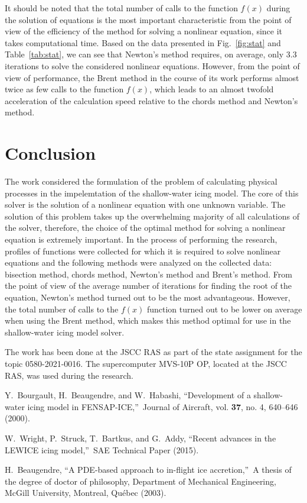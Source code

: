 \documentclass[
11pt,%
tightenlines,%
twoside,%
onecolumn,%
nofloats,%
nobibnotes,%
nofootinbib,%
superscriptaddress,%
noshowpacs,%
centertags]%
{revtex4}
\begin{document}
It should be noted that the total number of calls to the function $f(x)$ during the solution of equations is the most important characteristic from the point of view of the efficiency of the method for solving a nonlinear equation, since it takes computational time.
Based on the data presented in Fig.~\ref{fig:stat} and Table~\ref{tab:stat}, we can see that Newton's method requires, on average, only 3.3 iterations to solve the considered nonlinear equations.
However, from the point of view of performance, the Brent method in the course of its work performs almost twice as few calls to the function $f(x)$, which leads to an almost twofold acceleration of the calculation speed relative to the chords method and Newton's method.

\section{Conclusion}

The work considered the formulation of the problem of calculating physical processes in the impelemtation of the shallow-water icing model.
The core of this solver is the solution of a nonlinear equation with one unknown variable.
The solution of this problem takes up the overwhelming majority of all calculations of the solver, therefore, the choice of the optimal method for solving a nonlinear equation is extremely important.
In the process of performing the research, profiles of functions were collected for which it is required to solve nonlinear equations and the following methods were analyzed on the collected data: bisection method, chords method, Newton's method and Brent's method.
From the point of view of the average number of iterations for finding the root of the equation, Newton's method turned out to be the most advantageous.
However, the total number of calls to the $f(x)$ function turned out to be lower on average when using the Brent method, which makes this method optimal for use in the shallow-water icing model solver.
\begin{acknowledgments}
The work has been done at the JSCC RAS as part of the state assignment for the topic 0580-2021-0016.
The supercomputer MVS-10P OP, located at the JSCC RAS, was used during the research.
\end{acknowledgments}

\begin{thebibliography}{99}

Y.~Bourgault, H.~Beaugendre, and W.~Habashi, \textquotedblleft Development of a shallow-water icing model in FENSAP-ICE,\textquotedblright \ Journal of Aircraft, vol. \textbf{37}, no. 4, 640--646 (2000).

W.~Wright, P.~Struck, T.~Bartkus, and G.~Addy, \textquotedblleft Recent advances in the LEWICE icing model,\textquotedblright \ SAE Technical Paper (2015).

H.~Beaugendre, \textquotedblleft A PDE-based approach to in-flight ice accretion,\textquotedblright \ A thesis of the degree of doctor of philosophy, Department of Mechanical Engineering, McGill University, Montreal, Qu\'ebec (2003).

\end{thebibliography}
\end{document}

